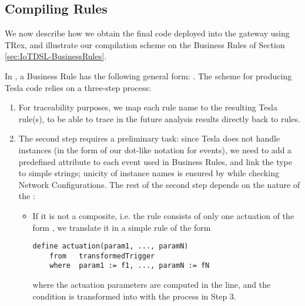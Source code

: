 \subsection{Compiling \IOTDSL Rules}
\label{sec:CG-Compilation}

We now describe how we obtain the final code deployed into the gateway using TRex, and illustrate our compilation scheme on the Business Rules of Section \ref{sec:IoTDSL-BusinessRules}.

In \IOTDSL, a Business Rule has the following general form: . The scheme for producing Tesla code relies on a three-step process:
\begin{enumerate}
	\item For traceability purposes, we map each rule name  to the resulting Tesla rule(s), to be able to trace in the future analysis results directly back to \IOTDSL rules.
	
	\item The second step requires a preliminary task: since Tesla does not handle instances (in the form of our dot-like notation for events), we need to add a predefined attribute  to each event  used in \IOTDSL Business Rules, and link the type  to simple strings; unicity of instance names is ensured by \IOTDSL while checking Network Configurations. The rest of the second step depends on the nature of the :
	\begin{itemize}
		\item If it is not a composite, i.e. the rule consists of only one actuation of the form , we translate it in a simple rule of the form
		\begin{lstlisting}[language=tesla, numbers=none]
	define actuation(param1, ..., paramN)
	from   transformedTrigger
	where  param1 := f1, ..., paramN := fN
		\end{lstlisting}
		where the actuation parameters are computed in the  line, and the  condition is transformed into  with the process in Step 3.
		

\end{itemize}
\end{enumerate}
